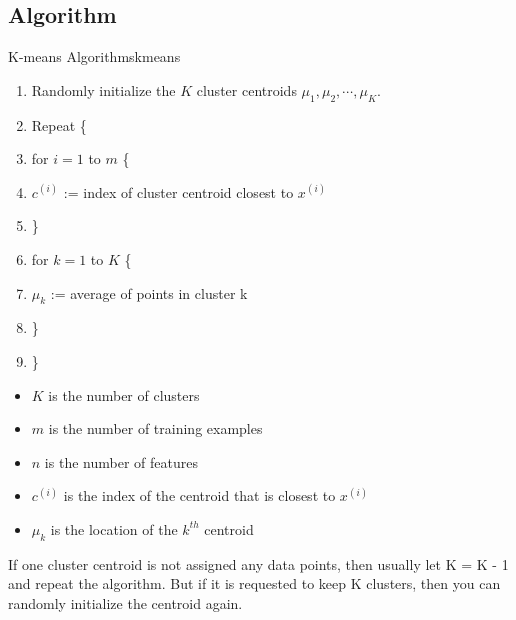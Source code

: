 \subsection*{Algorithm}
\begin{thmbox}{K-means Algorithms}{kmeans}
    \begin{enumerate}
        \item Randomly initialize the $K$ cluster centroids $\mu_1, \mu_2, \cdots, \mu_K$.
        \item Repeat \{
        \item[] \hspace*{1em} for $i = 1$ to $m$ \{
        \item[] \hspace*{2em} $c^{(i)}$ := index of cluster centroid closest to $x^{(i)}$
        \item[] \hspace*{1em} \}
        \item[] \hspace*{1em} for $k = 1$ to $K$ \{
        \item[] \hspace*{2em} $\mu_k$ := average of points in cluster k
        \item[] \hspace*{1em} \} 
        \item[] \}
    \end{enumerate}
    \tcblower
    \begin{notebox}
        \begin{itemize}
            \item $K$ is the number of clusters
            \item $m$ is the number of training examples
            \item $n$ is the number of features
            \item $c^{(i)}$ is the index of the centroid that is closest to $x^{(i)}$
            \item $\mu_k$ is the location of the $k^{th}$ centroid
        \end{itemize}
        \tcblower
        \hspace{2em} If one cluster centroid is not assigned any data points,
        then usually let K = K - 1 and repeat the algorithm.
        But if it is requested to keep K clusters, then you can randomly initialize the centroid again.
    \end{notebox}
\end{thmbox}


